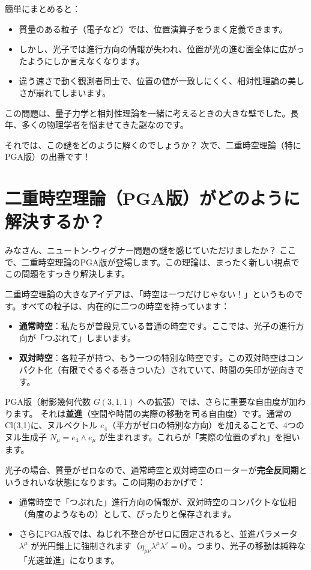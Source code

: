 \documentclass[dvipdfmx,a4paper,oneside]{jsbook}
\begin{document}
簡単にまとめると：
\begin{itemize}
  \item 質量のある粒子（電子など）では、位置演算子をうまく定義できます。
  \item しかし、光子では進行方向の情報が失われ、位置が光の進む面全体に広がったようにしか言えなくなります。
  \item 違う速さで動く観測者同士で、位置の値が一致しにくく、相対性理論の美しさが崩れてしまいます。
\end{itemize}

この問題は、量子力学と相対性理論を一緒に考えるときの大きな壁でした。長年、多くの物理学者を悩ませてきた謎なのです。

それでは、この謎をどのように解くのでしょうか？ 次で、二重時空理論（特にPGA版）の出番です！

\section{二重時空理論（PGA版）がどのように解決するか？}

みなさん、ニュートン‐ウィグナー問題の謎を感じていただけましたか？ ここで、二重時空理論のPGA版が登場します。この理論は、まったく新しい視点でこの問題をすっきり解決します。

二重時空理論の大きなアイデアは、「時空は一つだけじゃない！」というものです。すべての粒子は、内在的に二つの時空を持っています：
\begin{itemize}
  \item \textbf{通常時空}：私たちが普段見ている普通の時空です。ここでは、光子の進行方向が「つぶれて」しまいます。
  \item \textbf{双対時空}：各粒子が持つ、もう一つの特別な時空です。この双対時空はコンパクト化（有限でぐるぐる巻きついた）されていて、時間の矢印が逆向きです。
\end{itemize}

PGA版（射影幾何代数 \(G(3,1,1)\) への拡張）では、さらに重要な自由度が加わります。  
それは\textbf{並進}（空間や時間の実際の移動を司る自由度）です。通常のCl(3,1)に、ヌルベクトル \(e_4\)（平方がゼロの特別な方向）を加えることで、4つのヌル生成子 \(N_\mu = e_4 \wedge e_\mu\) が生まれます。これらが「実際の位置のずれ」を担います。

光子の場合、質量がゼロなので、通常時空と双対時空のローターが\textbf{完全反同期}というきれいな状態になります。この同期のおかげで：
\begin{itemize}
  \item 通常時空で「つぶれた」進行方向の情報が、双対時空のコンパクトな位相（角度のようなもの）として、ぴったりと保存されます。
  \item さらにPGA版では、ねじれ不整合がゼロに固定されると、並進パラメータ \(\lambda^\mu\) が光円錐上に強制されます（\(\eta_{\mu\nu}\lambda^\mu\lambda^\nu = 0\)）。つまり、光子の移動は純粋な「光速並進」になります。
\end{itemize}
\end{document}
